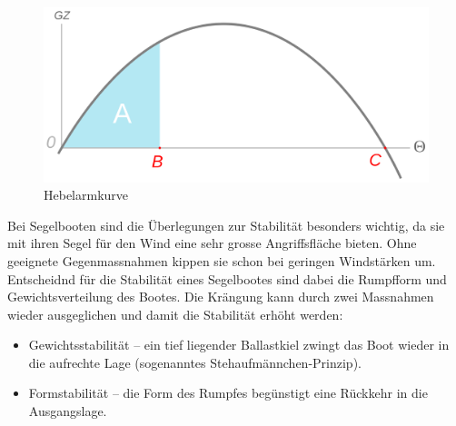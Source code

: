 \begin{figure}
    \centering
    \includegraphics[width=0.5\linewidth]{Stability_curve_NT.svg.png}
    \caption{Hebelarmkurve}
    \label{fig:enter-label}
\end{figure}
Bei Segelbooten sind die Überlegungen zur Stabilität besonders wichtig, da sie mit ihren Segel für den Wind eine sehr grosse Angriffsfläche bieten. Ohne geeignete Gegenmassnahmen kippen sie schon bei geringen Windstärken um. Entscheidnd für die Stabilität eines Segelbootes sind dabei die Rumpfform und Gewichtsverteilung des Bootes. Die Krängung kann durch zwei Massnahmen wieder ausgeglichen und damit die Stabilität erhöht werden: 
\begin{itemize}
    \item Gewichtsstabilität – ein tief liegender Ballastkiel zwingt das Boot wieder in die aufrechte Lage (sogenanntes Stehaufmännchen-Prinzip).
    \item Formstabilität – die Form des Rumpfes begünstigt eine Rückkehr in die Ausgangslage.
\end{itemize}

